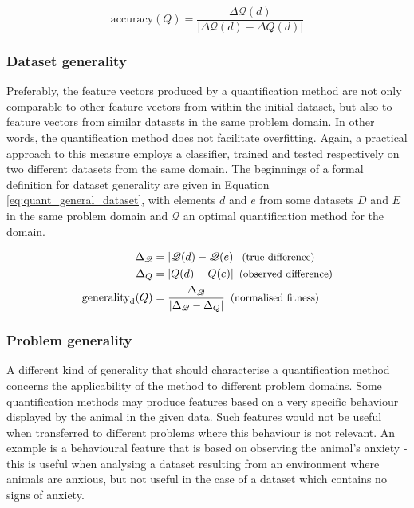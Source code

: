 \documentclass[conference,a4paper,twoside]{IEEEtran}
\begin{document}
\begin{equation} \label{eq:quant_accuracy}
    \text{accuracy}(Q) = \frac{\Delta \mathscr{Q}(d)}{\left| \Delta \mathscr{Q}(d) - \Delta Q(d) \right|}
\end{equation}

\subsubsection{Dataset generality}
Preferably, the feature vectors produced by a quantification method are not only comparable to other feature vectors from within the initial dataset, but also to feature vectors from similar datasets in the same problem domain. In other words, the quantification method does not facilitate overfitting. Again, a practical approach to this measure employs a classifier, trained and tested respectively on two different datasets from the same domain. The beginnings of a formal definition for dataset generality are given in Equation \ref{eq:quant_general_dataset}, with elements $d$ and $e$ from some datasets $D$ and $E$ in the same problem domain and $\mathscr{Q}$ an optimal quantification method for the domain.

\begin{equation}
\label{eq:quant_general_dataset}
\begin{split}
    \Delta_\mathscr{Q} &= | \mathscr{Q}(d) - \mathscr{Q}(e) | \text{\hspace{.5em}\footnotesize(true difference)} \\
    \Delta_Q &= | Q(d) - Q(e) | \text{\hspace{.5em}\footnotesize(observed difference)} \\
    \text{generality}_\text{d}(Q) &= \frac{\Delta_\mathscr{Q}}{| \Delta_\mathscr{Q} - \Delta_Q |} \text{\hspace{.5em}\footnotesize(normalised fitness)} \\
\end{split}
\end{equation}

\subsubsection{Problem generality}
A different kind of generality that should characterise a quantification method concerns the applicability of the method to different problem domains. Some quantification methods may produce features based on a very specific behaviour displayed by the animal in the given data. Such features would not be useful when transferred to different problems where this behaviour is not relevant. An example is a behavioural feature that is based on observing the animal's anxiety - this is useful when analysing a dataset resulting from an environment where animals are anxious, but not useful in the case of a dataset which contains no signs of anxiety.
\end{document}
